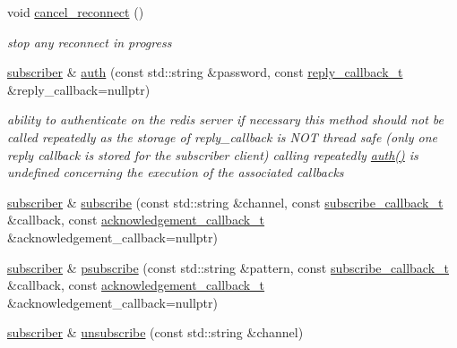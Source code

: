 \begin{DoxyCompactItemize}
void \mbox{\hyperlink{classcpp__redis_1_1subscriber_ae93de179d6ea83ece59cf1a30493c3e9}{cancel\+\_\+reconnect}} ()
\begin{DoxyCompactList}\small\item\em stop any reconnect in progress \end{DoxyCompactList}\item 
\mbox{\hyperlink{classcpp__redis_1_1subscriber}{subscriber}} \& \mbox{\hyperlink{classcpp__redis_1_1subscriber_a7b4564fc4dfe356b95aeae4fdb8071c9}{auth}} (const std\+::string \&password, const \mbox{\hyperlink{classcpp__redis_1_1subscriber_a5533ac876d3116911b54ff0dce28f61c}{reply\+\_\+callback\+\_\+t}} \&reply\+\_\+callback=nullptr)
\begin{DoxyCompactList}\small\item\em ability to authenticate on the redis server if necessary this method should not be called repeatedly as the storage of reply\+\_\+callback is N\+OT thread safe (only one reply callback is stored for the subscriber client) calling repeatedly \mbox{\hyperlink{classcpp__redis_1_1subscriber_a7b4564fc4dfe356b95aeae4fdb8071c9}{auth()}} is undefined concerning the execution of the associated callbacks \end{DoxyCompactList}\item 
\mbox{\hyperlink{classcpp__redis_1_1subscriber}{subscriber}} \& \mbox{\hyperlink{classcpp__redis_1_1subscriber_afee579c702182041645a3d3c55de4b9e}{subscribe}} (const std\+::string \&channel, const \mbox{\hyperlink{classcpp__redis_1_1subscriber_a2ac29261280f488dab483866ae875656}{subscribe\+\_\+callback\+\_\+t}} \&callback, const \mbox{\hyperlink{classcpp__redis_1_1subscriber_a19ea39dfabeb19937a9ce4c8d21781b4}{acknowledgement\+\_\+callback\+\_\+t}} \&acknowledgement\+\_\+callback=nullptr)
\item 
\mbox{\hyperlink{classcpp__redis_1_1subscriber}{subscriber}} \& \mbox{\hyperlink{classcpp__redis_1_1subscriber_a52605edb2a85d370680c3c9e1b84fc3b}{psubscribe}} (const std\+::string \&pattern, const \mbox{\hyperlink{classcpp__redis_1_1subscriber_a2ac29261280f488dab483866ae875656}{subscribe\+\_\+callback\+\_\+t}} \&callback, const \mbox{\hyperlink{classcpp__redis_1_1subscriber_a19ea39dfabeb19937a9ce4c8d21781b4}{acknowledgement\+\_\+callback\+\_\+t}} \&acknowledgement\+\_\+callback=nullptr)
\item 
\mbox{\hyperlink{classcpp__redis_1_1subscriber}{subscriber}} \& \mbox{\hyperlink{classcpp__redis_1_1subscriber_a08dffea41cfd5914adfa5a966e0ab292}{unsubscribe}} (const std\+::string \&channel)
\item 

\end{DoxyCompactItemize}
